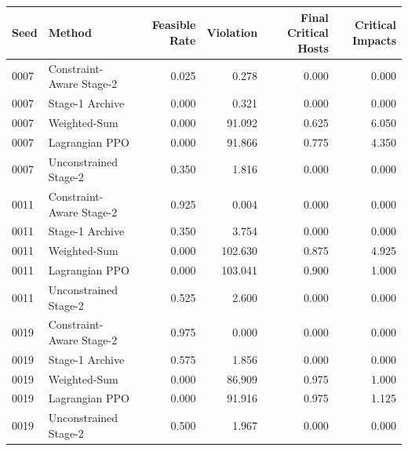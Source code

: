 \begin{tabular}{@{}llrrrr@{}}
\toprule
Seed & Method & Feasible Rate & Violation & Final Critical Hosts & Critical Impacts \\
\midrule
0007 & Constraint-Aware Stage-2 & 0.025 & 0.278 & 0.000 & 0.000 \\
0007 & Stage-1 Archive & 0.000 & 0.321 & 0.000 & 0.000 \\
0007 & Weighted-Sum & 0.000 & 91.092 & 0.625 & 6.050 \\
0007 & Lagrangian PPO & 0.000 & 91.866 & 0.775 & 4.350 \\
0007 & Unconstrained Stage-2 & 0.350 & 1.816 & 0.000 & 0.000 \\
0011 & Constraint-Aware Stage-2 & 0.925 & 0.004 & 0.000 & 0.000 \\
0011 & Stage-1 Archive & 0.350 & 3.754 & 0.000 & 0.000 \\
0011 & Weighted-Sum & 0.000 & 102.630 & 0.875 & 4.925 \\
0011 & Lagrangian PPO & 0.000 & 103.041 & 0.900 & 1.000 \\
0011 & Unconstrained Stage-2 & 0.525 & 2.600 & 0.000 & 0.000 \\
0019 & Constraint-Aware Stage-2 & 0.975 & 0.000 & 0.000 & 0.000 \\
0019 & Stage-1 Archive & 0.575 & 1.856 & 0.000 & 0.000 \\
0019 & Weighted-Sum & 0.000 & 86.909 & 0.975 & 1.000 \\
0019 & Lagrangian PPO & 0.000 & 91.916 & 0.975 & 1.125 \\
0019 & Unconstrained Stage-2 & 0.500 & 1.967 & 0.000 & 0.000 \\
\bottomrule
\end{tabular}
